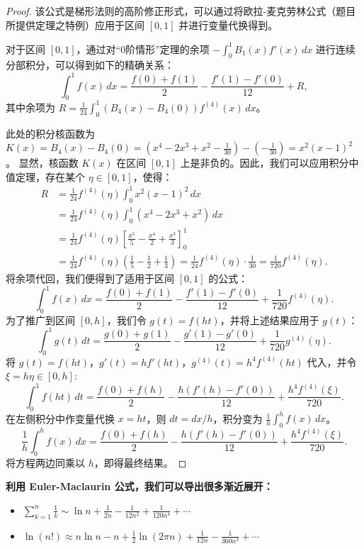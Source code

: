 \documentclass[lang=cn,10pt,thmcnt=section]{elegantbook}
\begin{document}
\begin{proof}
		该公式是梯形法则的高阶修正形式，可以通过将欧拉-麦克劳林公式（题目所提供定理之特例）应用于区间 \([0,1]\) 并进行变量代换得到。
	
		对于区间 \([0,1]\)，通过对“0阶情形”定理的余项 \(- \int_0^1 B_1(x) f'(x) \, dx\) 进行连续分部积分，可以得到如下的精确关系：
		\[
		\int_0^1 f(x) \, dx = \frac{f(0) + f(1)}{2} - \frac{f'(1) - f'(0)}{12} + R,
		\]
		其中余项为 $R = \frac{1}{24} \int_0^1 (B_4(x) - B_4(0)) f^{(4)}(x) \, dx$。
		
		此处的积分核函数为 $K(x) = B_4(x) - B_4(0) = (x^4 - 2x^3 + x^2 - \frac{1}{30}) - (-\frac{1}{30}) = x^2(x-1)^2$。
		显然，核函数 $K(x)$ 在区间 $[0,1]$ 上是非负的。因此，我们可以应用积分中值定理，存在某个 $\eta \in [0,1]$，使得：
		\begin{align*}
			R &= \frac{1}{24} f^{(4)}(\eta) \int_0^1 x^2(x-1)^2 \, dx \\
			&= \frac{1}{24} f^{(4)}(\eta) \int_0^1 (x^4 - 2x^3 + x^2) \, dx \\
			&= \frac{1}{24} f^{(4)}(\eta) \left[ \frac{x^5}{5} - \frac{x^4}{2} + \frac{x^3}{3} \right]_0^1 \\
			&= \frac{1}{24} f^{(4)}(\eta) \left( \frac{1}{5} - \frac{1}{2} + \frac{1}{3} \right) = \frac{1}{24} f^{(4)}(\eta) \cdot \frac{1}{30} = \frac{1}{720} f^{(4)}(\eta).
		\end{align*}
		将余项代回，我们便得到了适用于区间 \([0,1]\) 的公式：
		\[
		\int_0^1 f(x) \, dx = \frac{f(0) + f(1)}{2} - \frac{f'(1) - f'(0)}{12} + \frac{1}{720} f^{(4)}(\eta).
		\]
		为了推广到区间 \([0,h]\)，我们令 $g(t) = f(ht)$，并将上述结果应用于 $g(t)$：
		\[
		\int_0^1 g(t) \, dt = \frac{g(0) + g(1)}{2} - \frac{g'(1) - g'(0)}{12} + \frac{1}{720} g^{(4)}(\eta).
		\]
		将 $g(t)=f(ht)$，$g'(t)=hf'(ht)$，$g^{(4)}(t)=h^4f^{(4)}(ht)$ 代入，并令 $\xi=h\eta \in [0,h]$:
		\[
		\int_0^1 f(ht) \, dt = \frac{f(0) + f(h)}{2} - \frac{h(f'(h) - f'(0))}{12} + \frac{h^4 f^{(4)}(\xi)}{720}.
		\]
		在左侧积分中作变量代换 $x=ht$，则 $dt = dx/h$，积分变为 $\frac{1}{h}\int_0^h f(x) \, dx$。
		\[
		\frac{1}{h}\int_0^h f(x) \, dx = \frac{f(0) + f(h)}{2} - \frac{h(f'(h) - f'(0))}{12} + \frac{h^4 f^{(4)}(\xi)}{720}.
		\]
		将方程两边同乘以 $h$，即得最终结果。
\end{proof}
\textbf{利用 Euler-Maclaurin 公式，我们可以导出很多渐近展开：}
\begin{itemize}
    \item \(\sum_{k=1}^n \frac{1}{k} \sim \ln n + \frac{1}{2n} - \frac{1}{12n^2} + \frac{1}{120n^4} + \cdots\)
    \item \(\ln(n!) \approx n \ln n - n + \frac{1}{2} \ln(2\pi n) + \frac{1}{12n} - \frac{1}{360n^3} + \cdots\)
\end{itemize}
\end{document}
